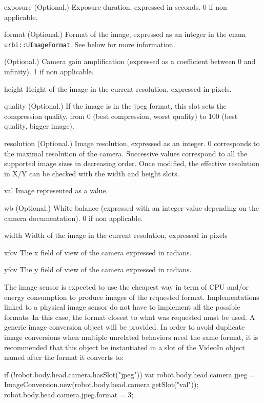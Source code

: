 \begin{urbiscriptapi}
\item[exposure]{} (Optional.) Exposure duration, expressed in seconds. 0 if
  non applicable.


\item[format]{} (Optional.)  Format of the image, expressed as an integer in
  the enum \lstinline{urbi::UImageFormat}.  See below for more information.


\item[gain]{} (Optional.)  Camera gain amplification (expressed as a
  coefficient between 0 and infinity). 1 if non applicable.


\item[height] Height of the image in the current resolution, expressed in
  pixels.


\item[quality]{} (Optional.)  If the image is in the jpeg format, this slot
  sets the compression quality, from 0 (best compression, worst quality) to
  100 (best quality, bigger image).


\item[resolution]{} (Optional.)  Image resolution, expressed as an
  integer. 0 corresponds to the maximal resolution of the camera. Successive
  values correspond to all the supported image sizes in decreasing order.
  Once modified, the effective resolution in X/Y can be checked with the
  width and height slots.


\item[val] Image represented as a  value.


\item[wb]{} (Optional.)  White balance (expressed with an integer value
  depending on the camera documentation). 0 if non applicable.


\item[width] Width of the image in the current resolution, expressed in
  pixels


\item[xfov] The x field of view of the camera expressed in radians.


\item[yfov] The y field of view of the camera expressed in radians.
\end{urbiscriptapi}

The image sensor is expected to use the cheapest way in term of CPU and/or
energy consumption to produce images of the requested format.
Implementations linked to a physical image sensor do not have to implement
all the possible formats. In this case, the format closest to what was
requested must be used.  A generic image conversion object will be
provided. In order to avoid duplicate image conversions when multiple
unrelated behaviors need the same format, it is recommended that this object
be instantiated in a slot of the VideoIn object named after the format it
converts to:
\begin{urbiunchecked}
if (!robot.body.head.camera.hasSlot("jpeg"))
{
  var robot.body.head.camera.jpeg =
    ImageConversion.new(robot.body.head.camera.getSlot("val"));
  robot.body.head.camera.jpeg.format = 3;
}
\end{urbiunchecked}



